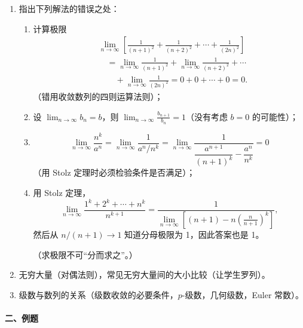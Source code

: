 \begin{enumerate}[label=\arabic*.]
  \item 指出下列解法的错误之处：
  \begin{enumerate}[label=(\arabic*)]
    \item 计算极限
    \begin{align*}
      &\lim_{n\to\infty}\left[\frac1{(n+1)^2}+\frac1{(n+2)^2}+\cdots+\frac1{(2n)^2}\right]\\
      &\quad=\lim_{n\to\infty}\frac1{(n+1)^2}
      +\lim_{n\to\infty}\frac1{(n+2)^2}+\cdots\\
      &\qquad+\lim_{n\to\infty}\frac1{(2n)^2}
      =0+0+\cdots+0=0.
    \end{align*}
    （错用收敛数列的四则运算法则）；
    \item 设 $\displaystyle\lim_{n\to\infty}b_n=b$，则 $\displaystyle\lim_{n\to\infty}\frac{b_{n+1}}{b_n}=1$（没有考虑 $b=0$ 的可能性）；
    \item
    \[
      \lim_{n\to\infty}\frac{n^k}{a^n}
      =\lim_{n\to\infty}\frac1{a^n/n^k}
      =\lim_{n\to\infty}\frac1{\dfrac{a^{n+1}}{(n+1)^k}-\dfrac{a^n}{n^k}}=0
    \]
    （用 Stolz 定理时必须检验条件是否满足）；
    \item 用 Stolz 定理，
    \[
      \lim_{n\to\infty}\frac{1^k+2^k+\cdots+n^k}{n^{k+1}}
      =\frac1{\displaystyle\lim_{n\to\infty}\left[(n+1)-n\left(\frac n{n+1}\right)^k\right]},
    \]
    然后从 $n/(n+1)\to1$ 知道分母极限为 1，因此答案也是 1。

    （求极限不可“分而求之”。）
  \end{enumerate}
  \item 无穷大量（对偶法则），常见无穷大量间的大小比较（让学生罗列）。
  \item 级数与数列的关系（级数收敛的必要条件，$p$-级数，几何级数，Euler 常数）。
\end{enumerate}

\paragraph{二、例题}

